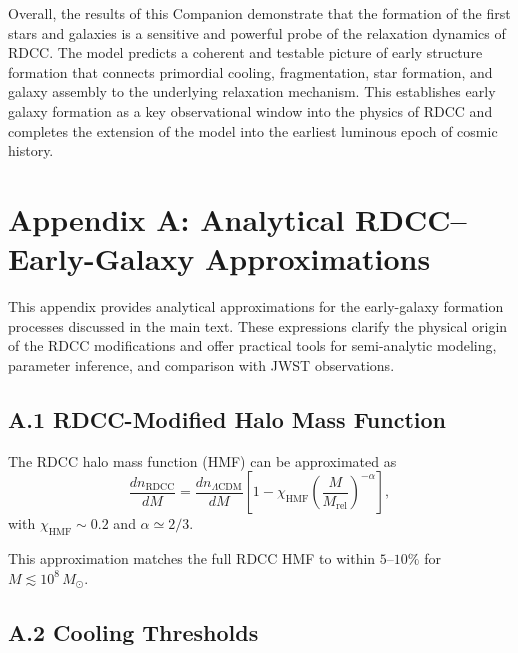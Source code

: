 \documentclass[11pt,a4paper]{article}
\begin{document}
Overall, the results of this Companion demonstrate that the formation of the first stars and 
galaxies is a sensitive and powerful probe of the relaxation dynamics of RDCC. The model 
predicts a coherent and testable picture of early structure formation that connects primordial 
cooling, fragmentation, star formation, and galaxy assembly to the underlying relaxation 
mechanism. This establishes early galaxy formation as a key observational window into the 
physics of RDCC and completes the extension of the model into the earliest luminous epoch of 
cosmic history.

\section*{Appendix A: Analytical RDCC–Early-Galaxy Approximations}

This appendix provides analytical approximations for the early-galaxy formation processes 
discussed in the main text. These expressions clarify the physical origin of the RDCC 
modifications and offer practical tools for semi-analytic modeling, parameter inference, and 
comparison with JWST observations.

\subsection*{A.1 RDCC-Modified Halo Mass Function}

The RDCC halo mass function (HMF) can be approximated as
\begin{equation}
    \frac{dn_{\mathrm{RDCC}}}{dM}
    = \frac{dn_{\Lambda\mathrm{CDM}}}{dM}
      \left[
        1 - \chi_{\mathrm{HMF}}
        \left(\frac{M}{M_{\mathrm{rel}}}\right)^{-\alpha}
      \right],
\end{equation}
with $\chi_{\mathrm{HMF}} \sim 0.2$ and $\alpha \simeq 2/3$.

This approximation matches the full RDCC HMF to within $5$–$10\%$ for 
$M \lesssim 10^{8}\,M_{\odot}$.

\subsection*{A.2 Cooling Thresholds}
\end{document}
